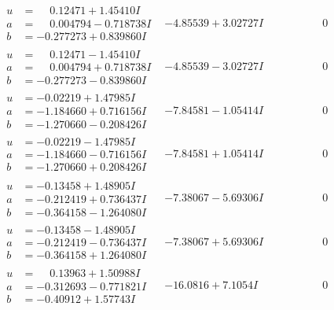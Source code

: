 \documentclass[1p]{elsarticle_modified}
\theoremstyle{definition}
\begin{document}
$$\begin{array}{c|c|c}
\begin{aligned}
u &= \phantom{-}0.12471 + 1.45410 I \\
a &= \phantom{-}0.004794 - 0.718738 I \\
b &= -0.277273 + 0.839860 I\end{aligned}
 & -4.85539 + 3.02727 I & \phantom{-0.000000 } 0 \\ \hline\begin{aligned}
u &= \phantom{-}0.12471 - 1.45410 I \\
a &= \phantom{-}0.004794 + 0.718738 I \\
b &= -0.277273 - 0.839860 I\end{aligned}
 & -4.85539 - 3.02727 I & \phantom{-0.000000 } 0 \\ \hline\begin{aligned}
u &= -0.02219 + 1.47985 I \\
a &= -1.184660 + 0.716156 I \\
b &= -1.270660 - 0.208426 I\end{aligned}
 & -7.84581 - 1.05414 I & \phantom{-0.000000 } 0 \\ \hline\begin{aligned}
u &= -0.02219 - 1.47985 I \\
a &= -1.184660 - 0.716156 I \\
b &= -1.270660 + 0.208426 I\end{aligned}
 & -7.84581 + 1.05414 I & \phantom{-0.000000 } 0 \\ \hline\begin{aligned}
u &= -0.13458 + 1.48905 I \\
a &= -0.212419 + 0.736437 I \\
b &= -0.364158 - 1.264080 I\end{aligned}
 & -7.38067 - 5.69306 I & \phantom{-0.000000 } 0 \\ \hline\begin{aligned}
u &= -0.13458 - 1.48905 I \\
a &= -0.212419 - 0.736437 I \\
b &= -0.364158 + 1.264080 I\end{aligned}
 & -7.38067 + 5.69306 I & \phantom{-0.000000 } 0 \\ \hline\begin{aligned}
u &= \phantom{-}0.13963 + 1.50988 I \\
a &= -0.312693 - 0.771821 I \\
b &= -0.40912 + 1.57743 I\end{aligned}
 & -16.0816 + 7.1054 I & \phantom{-0.000000 } 0 \\ \hline\begin{aligned}

\end{aligned}
\end{array}$$
\end{document}
